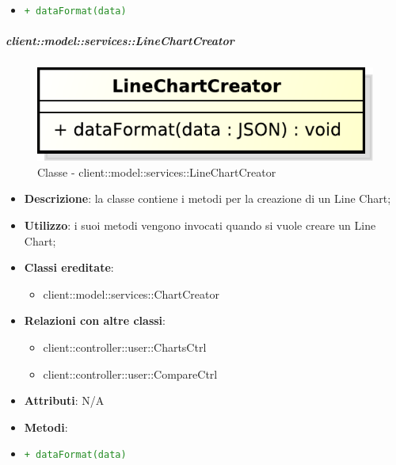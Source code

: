 \begin{itemize}
\begin{itemize}
\begin{description}
						\end{description}
						\item \textcolor{forestgreen}{\texttt{+ dataFormat(data)}}

					\end{itemize}
			\end{itemize}

		\subparagraph{client::model::services::LineChartCreator} %
		\label{subp:linechartcreator}
			\begin{figure}[htbp]
				\centering
				\centerline{\includegraphics[scale=0.7]{./images/client/classes/model/line_chart_creator.pdf}}
				\caption{Classe - client::model::services::LineChartCreator}
			\end{figure}
			\begin{itemize}
				\item \textbf{Descrizione}: la classe contiene i metodi per la creazione di un Line Chart;
				\item \textbf{Utilizzo}: i suoi metodi vengono invocati quando si vuole creare un Line Chart;
				\item \textbf{Classi ereditate}:
					\begin{itemize}
						\item client::model::services::ChartCreator
					\end{itemize}
				\item \textbf{Relazioni con altre classi}:
					\begin{itemize}
						\item client::controller::user::ChartsCtrl
						\item client::controller::user::CompareCtrl
					\end{itemize}
				\item \textbf{Attributi}: N/A
				\item \textbf{Metodi}: 
					\item \textcolor{forestgreen}{\texttt{+ dataFormat(data)}}
			\end{itemize}


